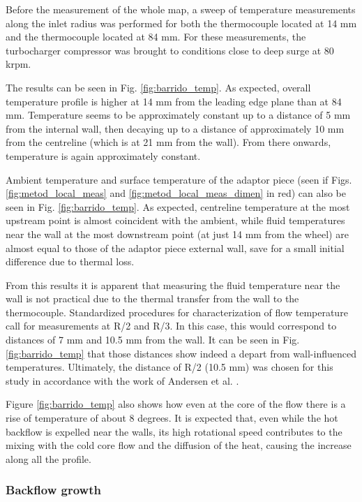 Before the measurement of the whole map, a sweep of temperature measurements along the inlet radius was performed for both the thermocouple located at 14 mm and the thermocouple located at 84 mm. For these measurements, the turbocharger compressor was brought to conditions close to deep surge at 80 krpm.

The results can be seen in Fig. \ref{fig:barrido_temp}. As expected, overall temperature profile is higher at 14 mm from the leading edge plane than at 84 mm. Temperature seems to be approximately constant up to a distance of 5 mm from the internal wall, then decaying up to a distance of approximately 10 mm from the centreline (which is at 21 mm from the wall). From there onwards, temperature is again approximately constant.

Ambient temperature and surface temperature of the adaptor piece (seen if Figs. \ref{fig:metod_local_meas} and \ref{fig:metod_local_meas_dimen} in red) can also be seen in Fig. \ref{fig:barrido_temp}. As expected, centreline temperature at the most upstream point is almost coincident with the ambient, while fluid temperatures near the wall at the most downstream point (at just 14 mm from the wheel) are almost equal to those of the adaptor piece external wall, save for a small initial difference due to thermal loss.

From this results it is apparent that measuring the fluid temperature near the wall is not practical due to the thermal transfer from the wall to the thermocouple. Standardized procedures for characterization of flow temperature call for measurements at R/2 and R/3. In this case, this would correspond to distances of 7 mm and 10.5 mm from the wall. It can be seen in Fig. \ref{fig:barrido_temp} that those distances show indeed a depart from wall-influenced temperatures. Ultimately, the distance of R/2 (10.5 mm) was chosen for this study in accordance with the work of Andersen et al. \cite{andersen2009surge}.

Figure \ref{fig:barrido_temp} also shows how even at the core of the flow there is a rise of temperature of about 8 degrees. It is expected that, even while the hot backflow is expelled near the walls, its high rotational speed contributes to the mixing with the cold core flow and the diffusion of the heat, causing the increase along all the profile. 

\subsubsection{Backflow growth}


